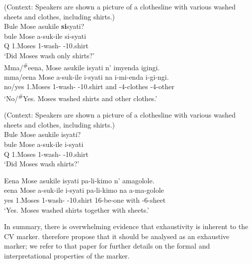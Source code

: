 \documentclass[output=paper]{langscibook}
\begin{document}
\ea
\label{bkm:Ref122709209}
(Context: Speakers are shown a picture of a clothesline with various washed sheets and clothes, including shirts.)\\
\ea
Bule Mose asukile \textbf{si}syati?\\
\gll
bule  Mose  a-suk-ile  si-syati\\
Q  1.Moses  1\SM{}-wash-\PFV{}  \EXH{}-10.shirt\\
\glt
‘Did Moses wash only shirts?’\\

\ex
Mma/\textsuperscript{\#}eena, Mose asukile isyati n’ imyenda igingi.\\
\gll
mma/eena  Mose  a-suk-ile  i-syati   na  i-mi-enda  i-gi-ngi.\\
no/yes  1.Moses  1\SM{}-wash-\PFV{}  \AUG{}-10.shirt  and  \AUG{}-4-clothes  \AUG{}-4-other\\
\glt
‘No/\textsuperscript{\#}Yes. Moses washed shirts and other clothes.’ \citep[340]{vanderWalLusekelo2022}\\

\z
\z

\ea
\label{bkm:Ref56946442}\label{bkm:Ref122709211}
(Context: Speakers are shown a picture of a clothesline with various washed sheets and clothes, including shirts.)\\
\ea
Bule Mose asukile isyati?\\
\gll
bule  Mose  a-suk-ile  i-syati  \\
Q  1.Moses  1\SM{}-wash-\PFV{}  \AUG{}-10.shirt\\
\glt ‘Did Moses wash shirts?’

\ex
Eena Mose asukile isyati pa-li-kimo n’ amagolole.\\
\gll
eena  Mose  a-suk-ile  i-syati  pa-li-kimo  na  a-ma-golole\\
yes  1.Moses  1\SM{}-wash-\PFV{}  \AUG{}-10.shirt  16-be-one  with  \AUG{}-6-sheet\\
\glt
‘Yes. Moses washed shirts together with sheets.’ \citep[340]{vanderWalLusekelo2022}\\

\z
\z

In summary, there is overwhelming evidence that exhaustivity is inherent to the CV marker.  therefore propose that it should be analysed as an exhaustive marker; we refer to that paper for further details on the formal and interpretational properties of the marker.
\end{document}
